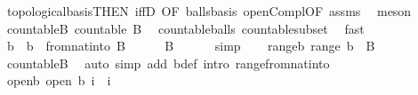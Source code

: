 \begin{isabellebody}
\ topological{\isacharunderscore}{\kern0pt}basis{\isacharbrackleft}{\kern0pt}THEN\ iffD{}{\isacharcomma}{\kern0pt}\ OF\ balls{\isacharunderscore}{\kern0pt}basis{\isacharbrackright}{\kern0pt}\ open{\isacharunderscore}{\kern0pt}Compl{\isacharbrackleft}{\kern0pt}OF\ assms{\isacharparenleft}{\kern0pt}{}{\isacharparenright}{\kern0pt}{\isacharbrackright}{\kern0pt}\ \isamarkupfalse%
\ meson\isanewline
\ \ \isamarkupfalse%
\ countable{\isacharunderscore}{\kern0pt}B{\isacharcolon}{\kern0pt}\ {\isachardoublequoteopen}countable\ B{\isachardoublequoteclose}\ \isamarkupfalse%
\ countable{\isacharunderscore}{\kern0pt}balls\ countable{\isacharunderscore}{\kern0pt}subset\ \isamarkupfalse%
\ fast\isanewline
\isanewline
\ \ \isamarkupfalse%
\ b\ \ {\isachardoublequoteopen}b\ {\isacharequal}{\kern0pt}\ from{\isacharunderscore}{\kern0pt}nat{\isacharunderscore}{\kern0pt}into\ {\isacharparenleft}{\kern0pt}B\ {\isasymunion}\ {\isacharbraceleft}{\kern0pt}{\isacharbraceleft}{\kern0pt}{\isacharbraceright}{\kern0pt}{\isacharbraceright}{\kern0pt}{\isacharparenright}{\kern0pt}{\isachardoublequoteclose}\isanewline
\ \ \isamarkupfalse%
\ {\isachardoublequoteopen}B\ {\isasymunion}\ {\isacharbraceleft}{\kern0pt}{\isacharbraceleft}{\kern0pt}{\isacharbraceright}{\kern0pt}{\isacharbraceright}{\kern0pt}\ {\isasymnoteq}\ {\isacharbraceleft}{\kern0pt}{\isacharbraceright}{\kern0pt}{\isachardoublequoteclose}\ \isamarkupfalse%
\ simp\isanewline
\ \ \isamarkupfalse%
\ range{\isacharunderscore}{\kern0pt}b{\isacharcolon}{\kern0pt}\ {\isachardoublequoteopen}range\ b\ {\isacharequal}{\kern0pt}\ B\ {\isasymunion}\ {\isacharbraceleft}{\kern0pt}{\isacharbraceleft}{\kern0pt}{\isacharbraceright}{\kern0pt}{\isacharbraceright}{\kern0pt}{\isachardoublequoteclose}\ \isamarkupfalse%
\ countable{\isacharunderscore}{\kern0pt}B\ \isamarkupfalse%
\ {\isacharparenleft}{\kern0pt}auto\ simp\ add{\isacharcolon}{\kern0pt}\ b{\isacharunderscore}{\kern0pt}def\ intro{\isacharbang}{\kern0pt}{\isacharcolon}{\kern0pt}\ range{\isacharunderscore}{\kern0pt}from{\isacharunderscore}{\kern0pt}nat{\isacharunderscore}{\kern0pt}into{\isacharparenright}{\kern0pt}\isanewline
\ \ \isamarkupfalse%
\ open{\isacharunderscore}{\kern0pt}b{\isacharcolon}{\kern0pt}\ {\isachardoublequoteopen}open\ {\isacharparenleft}{\kern0pt}b\ i{\isacharparenright}{\kern0pt}{\isachardoublequoteclose}\ \ i\ \isamarkupfalse%

\end{isabellebody}
